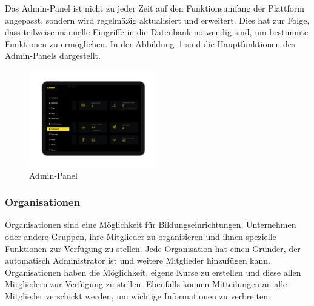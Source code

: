 \documentclass[main.tex]{subfiles}
\begin{document}
    Das Admin-Panel ist nicht zu jeder Zeit auf den Funktionsumfang der Plattform angepasst, sondern wird regelmäßig aktualisiert und erweitert.
    Dies hat zur Folge, dass teilweise manuelle Eingriffe in die Datenbank notwendig sind, um bestimmte Funktionen zu ermöglichen.
    In der Abbildung~\ref{fig:admin-panel} sind die Hauptfunktionen des Admin-Panels dargestellt.
    \begin{figure}[h]
        \centering
        \includegraphics[width=0.5\textwidth]{assets/admin-panel}
        \caption{Admin-Panel}
        \label{fig:admin-panel}
    \end{figure}
    \subsubsection{Organisationen}
    Organisationen sind eine Möglichkeit für Bildungseinrichtungen, Unternehmen oder andere Gruppen, ihre Mitglieder zu organisieren und ihnen spezielle Funktionen zur Verfügung zu stellen.
    Jede Organisation hat einen Gründer, der automatisch Administrator ist und weitere Mitglieder hinzufügen kann.
    Organisationen haben die Möglichkeit, eigene Kurse zu erstellen und diese allen Mitgliedern zur Verfügung zu stellen.
    Ebenfalls können Mitteilungen an alle Mitglieder verschickt werden, um wichtige Informationen zu verbreiten.
\end{document}
